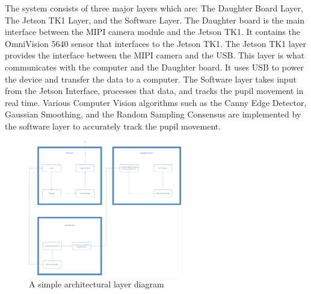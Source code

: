 The system consists of three major layers which are: The Daughter Board Layer, The Jetson TK1 Layer, and the Software Layer. The Daughter board is the main interface between the MIPI camera module and the Jetson TK1. It contains the OmniVision 5640 sensor that interfaces to the Jetson TK1.
The Jetson TK1 layer provides the interface between the MIPI camera and the USB. This layer is what communicates with the computer and the Daughter board. It uses USB to power the device and transfer the data to a computer. 
The Software layer takes input from the Jetson Interface, processes that data, and tracks the pupil movement in real time. Various Computer Vision algorithms such as the Canny Edge Detector, Gaussian Smoothing, and the Random Sampling Consensus are implemented by the software layer to accurately track the pupil movement.



\begin{figure}[h!]
	\centering
 	\includegraphics[width=0.60\textwidth]{images/Diagram_WHOLE.jpg}
 \caption{A simple architectural layer diagram}
\end{figure}

